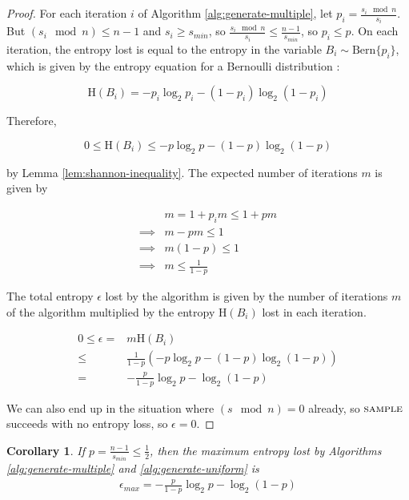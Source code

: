 \documentclass[lettersize,onecolumn]{IEEEtran}
\newtheorem{corollary}{Corollary}
\newcommand{\bern}[1]{\mathrm{Bern}\{#1\}}
\newcommand{\entropy}[1]{\mathrm{H}(#1)}
\begin{document}
\begin{proof}
For each iteration $i$ of Algorithm \ref{alg:generate-multiple}, let $p_i = \frac{s_i \mod n}{s_i}$. But $(s_i \mod n) \le n-1$ and $s_i \ge s_{min}$, so $\frac{s_i \mod n}{s_i} \le \frac{n-1}{s_{min}}$, so $p_i \le p$. On each iteration, the entropy lost is equal to the entropy in the variable $B_i \sim \bern{p_i}$, which is given by the entropy equation for a Bernoulli distribution \cite{cover1999elements}:

\begin{equation}
\entropy{B_i} = -p_i\log_2p_i - (1-p_i)\log_2(1-p_i)
\end{equation}

Therefore, 

\begin{equation}
0 \le \entropy{B_i} \le -p\log_2p - (1-p)\log_2(1-p) 
\end{equation}

by Lemma \ref{lem:shannon-inequality}. The expected number of iterations $m$ is given by

\begin{align}
& m = 1 + p_im \le 1 + pm \\
\implies & m-pm \le 1 \\
\implies & m(1-p) \le 1 \\
\implies & m \le \frac{1}{1-p}
\end{align}

The total entropy $\epsilon$ lost by the algorithm is given by the number of iterations $m$ of the algorithm multiplied by the entropy $\entropy{B_i}$ lost in each iteration.

\begin{align}
0 \le \epsilon
    = & m\entropy{B_i} \\
    \le & \frac{1}{1-p}(-p\log_2p - (1-p)\log_2(1-p) ) \\
    = & -\frac{p}{1-p}\log_2p - \log_2(1-p)
\end{align}

We can also end up in the situation where $(s \mod n) = 0$ already, so $\textsc{sample}$ succeeds with no entropy loss, so $\epsilon=0$.
\end{proof}

\begin{corollary}
    If $p = \frac{n-1}{s_{min}} \le \frac{1}{2}$, then the maximum entropy lost by Algorithms \ref{alg:generate-multiple} and \ref{alg:generate-uniform} is
\begin{align}
    \label{eq:epsilon-max}
    \epsilon_{max} = -\frac{p}{1-p}\log_2p - \log_2(1-p)
\end{align}
\end{corollary}
\end{document}
